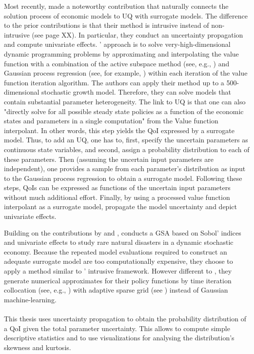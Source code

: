Most recently, \cite{Scheidegger.2019} made a noteworthy contribution that naturally connects the solution process of economic models to UQ with surrogate models. The difference to the prior contributions is that their method is intrusive instead of non-intrusive (see page XX). In particular, they conduct an uncertainty propagation and compute univariate effects. \citeauthor{Scheidegger.2019}' approach is to solve very-high-dimensional dynamic programming problems by approximating and interpolating the value function with a combination of the active subspace method (see, e.g., \cite{Constantine.2015}) and Gaussian process regression (see, for example, \cite{Rasmussen.2005}) within each iteration of the value function iteration algorithm. The authors can apply their method up to a 500-dimensional stochastic growth model. Therefore, they can solve models that contain substantial parameter heterogeneity.
The link to UQ is that one can also "directly solve for all possible steady state policies as a function of the economic states and parameters in a single computation" \cite[p.~4]{Scheidegger.2019} from the Value function interpolant. In other words, this step yields the QoI expressed by a surrogate model. Thus, to add an UQ, one has to, first, specify the uncertain parameters as continuous state variables, and second, assign a probability distribution to each of these parameters. Then (assuming the uncertain input parameters are independent), one provides a sample from each parameter's distribution as input to the Gaussian process regression to obtain a surrogate model. Following these steps, QoIs can be expressed as functions of the uncertain input parameters without much additional effort. Finally, by using a processed value function interpolant as a surrogate model, \citeauthor{Scheidegger.2019} propagate the model uncertainty and depict univariate effects.

Building on the contributions by \cite{Harenberg.2019} and \cite{Scheidegger.2019}, \cite{Usui.2019} conducts a GSA based on Sobol' indices and univariate effects to study rare natural disasters in a dynamic stochastic economy. Because the repeated model evaluations required to construct an adequate surrogate model are too computationally expensive, they choose to apply a  method similar to \citeauthor{Scheidegger.2019}' intrusive framework. However different to \cite{Scheidegger.2019}, they generate numerical approximates for their policy functions by time iteration collocation (see, e.g., \cite{Judd.1998}) with adaptive sparse grid (see  \cite{Scheidegger.2018}) instead of Gaussian machine-learning.\\
\\
This thesis uses uncertainty propagation to obtain the probability distribution of a QoI given the total parameter uncertainty. This allows to compute simple descriptive statistics and to use visualizations for analysing the distribution's skewness and kurtosis.

